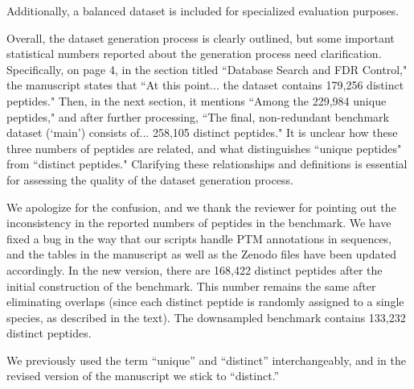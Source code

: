 \documentclass{article}
\newcommand{\response}[1]{\vspace*{1ex} \color{blue} \noindent #1 \color{black}
	\vspace*{2ex}}
\begin{document}
Additionally, a balanced dataset is included for specialized evaluation purposes.

Overall, the dataset generation process is clearly outlined, but some important statistical numbers reported about the generation process need clarification. Specifically, on page 4, in the section titled ``Database Search and FDR Control," the manuscript states that ``At this point... the dataset contains 179,256 distinct peptides." Then, in the next section, it mentions ``Among the 229,984 unique peptides," and after further processing, ``The final, non-redundant benchmark dataset (`main') consists of... 258,105 distinct peptides." It is unclear how these three numbers of peptides are related, and what distinguishes ``unique peptides" from ``distinct peptides." Clarifying these relationships and definitions is essential for assessing the quality of the dataset generation process.

\response{We apologize for the confusion, and we thank the reviewer for pointing out the inconsistency in the reported numbers of peptides in the benchmark.
  We have fixed a bug in the way that our scripts handle PTM annotations in sequences, and the tables in the manuscript as well as the Zenodo files have been updated accordingly.
  In the new version, there are 168,422 distinct peptides after the initial construction of the benchmark.
  This number remains the same after eliminating overlaps (since each distinct peptide is randomly assigned to a single species, as described in the text).
  The downsampled benchmark contains 133,232 distinct peptides.

  We previously used the term ``unique'' and ``distinct'' interchangeably, and in the revised version of the manuscript we stick to ``distinct.''
}



\end{document}

